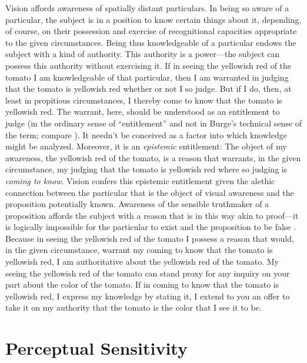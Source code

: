 \documentclass[12pt]{article}
\begin{document}
Vision affords awareness of spatially distant particulars. In being so aware of a particular, the subject is in a position to know certain things about it, depending, of course, on their possession and exercise of recognitional capacities appropriate to the given circumstances. Being thus knowledgeable of a particular endows the subject with a kind of authority. This authority is a power---the subject can possess this authority without exercising it. If in seeing the yellowish red of the tomato I am knowledgeable of that particular, then I am warranted in judging that the tomato is yellowish red whether or not I so judge. But if I do, then, at least in propitious circumstances, I thereby come to know that the tomato is yellowish red. The warrant, here, should be understood as an entitlement to judge (in the ordinary sense of ``entitlement'' and not in Burge's \citeyear{Burge:2003fk} technical sense of the term; compare \citealt[132n]{McDowell:2009ys}). It needn't be conceived as a factor into which knowledge might be analyzed. Moreover, it is an \emph{epistemic} entitlement: The object of my awareness, the yellowish red of the tomato, is a reason that warrants, in the given circumstance, my judging that the tomato is yellowish red where so judging is \emph{coming to know}. Vision confers this epistemic entitlement given the alethic connection between the particular that is the object of visual awareness and the proposition potentially known. Awareness of the sensible truthmaker of a proposition affords the subject with a reason that is in this way akin to proof---it is logically impossible for the particular to exist and the proposition to be false \citep[see][]{Cook-Wilson:1926sf,Kalderon:2010fk}. Because in seeing the yellowish red of the tomato I possess a reason that would, in the given circumstance, warrant my coming to know that the tomato is yellowish red, I am authoritative about the yellowish red of the tomato. My seeing the yellowish red of the tomato can stand proxy for any inquiry on your part about the color of the tomato. If in coming to know that the tomato is yellowish red, I express my knowledge by stating it, I extend to you an offer to take it on my authority that the tomato is the color that I see it to be. 


\section{Perceptual Sensitivity} %
\label{sec:perceptual_sensitivity}
\end{document}
